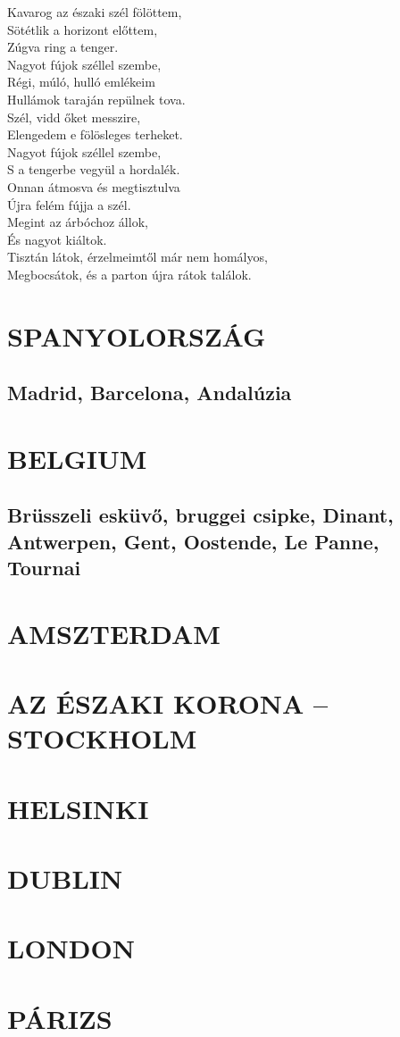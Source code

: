 \bigskip
\begin{LVerse}
Kavarog az északi szél fölöttem,		\\
Sötétlik a horizont előttem,			\\
Zúgva ring a tenger.				\\
Nagyot fújok széllel szembe,			\\
Régi, múló, hulló emlékeim			\\
Hullámok taraján repülnek tova.			\\
Szél, vidd őket messzire,			\\
Elengedem e fölösleges terheket.		\\
Nagyot fújok széllel szembe,			\\
S a tengerbe vegyül a hordalék.			\\
Onnan átmosva és megtisztulva			\\
Újra felém fújja a szél.			\\
Megint az árbóchoz állok,			\\
És nagyot kiáltok.				\\
Tisztán látok, érzelmeimtől már nem homályos,	\\
Megbocsátok, és a parton újra rátok találok.
\end{LVerse}

\chapter{SPANYOLORSZÁG}

\section{Madrid, Barcelona, Andalúzia}

\chapter{BELGIUM}

\section{Brüsszeli esküvő, bruggei csipke, Dinant,
	Antwerpen, Gent, Oostende, Le Panne, Tournai}

\chapter{AMSZTERDAM}

\chapter{AZ ÉSZAKI KORONA -- STOCKHOLM}

\chapter{HELSINKI}

\chapter{DUBLIN}

\chapter{LONDON}

\chapter{PÁRIZS}

